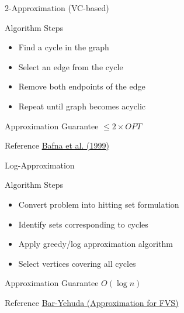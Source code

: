 \documentclass[aspectratio=169]{beamer}
\begin{document}
\begin{frame}{2-Approximation (VC-based)}

\begin{block}{Algorithm Steps}
\begin{itemize}
\item Find a cycle in the graph
\item Select an edge from the cycle
\item Remove both endpoints of the edge
\item Repeat until graph becomes acyclic
\end{itemize}
\end{block}

\begin{exampleblock}{Approximation Guarantee}
$\leq 2 \times OPT$
\end{exampleblock}

\begin{alertblock}{Reference}
\href{https://csaws.cs.technion.ac.il/~reuven/SAVE/OTHERS/vfs_bafna.pdf}{Bafna et al. (1999)}
\end{alertblock}

\end{frame}
\begin{frame}{Log-Approximation}

\begin{block}{Algorithm Steps}
\begin{itemize}
\item Convert problem into hitting set formulation
\item Identify sets corresponding to cycles
\item Apply greedy/log approximation algorithm
\item Select vertices covering all cycles
\end{itemize}
\end{block}

\begin{exampleblock}{Approximation Guarantee}
$O(\log n)$
\end{exampleblock}

\begin{alertblock}{Reference}
\href{https://doi.org/10.1137/S0097539796303400}{Bar-Yehuda (Approximation for FVS)}
\end{alertblock}

\end{frame}
\end{document}

